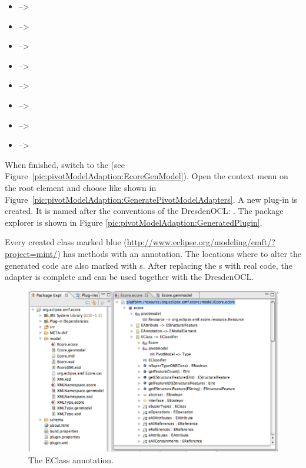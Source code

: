 \begin{itemize}
  \item {} --\textgreater {}
  \item {} --\textgreater {}
  \item {} --\textgreater {}
  \item {} --\textgreater {}
  \item {} --\textgreater {}
  \item {} --\textgreater {}
  \item {} --\textgreater {}
  \item {} --\textgreater {}
\end{itemize}

When finished, switch to the  (see 
Figure~\ref{pic:pivotModelAdaption:EcoreGenModel}). Open the context menu on 
the root element and choose  like shown in
Figure~\ref{pic:pivotModelAdaption:GeneratePivotModelAdapters}. A new plug-in 
is created. It is named after the conventions of the DresdenOCL:
. The package explorer is shown in Figure \ref{pic:pivotModelAdaption:GeneratedPlugin}.

Every created class marked blue 
(\url{http://www.eclipse.org/modeling/emft/?project=mint/}) has methods with an
 annotation. The locations where to alter the generated code 
are also marked with s. After replacing the s with real 
code, the adapter is complete and can be used together with the DresdenOCL.

\begin{figure}[!b]
	\centering
	\includegraphics[width=1.0\linewidth]{figures/pivotModelAdaption/EClassAnnotation}
	\caption{The EClass annotation.}
	\label{pic:pivotModelAdaption:EClassAnnotation}
\end{figure}

